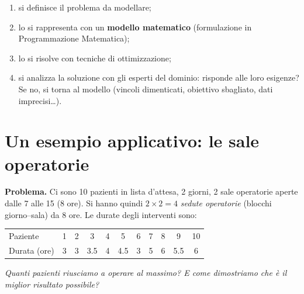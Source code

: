 \begin{center}
\end{center}
\begin{enumerate}[nosep]
  \item si definisce il problema da modellare;
  \item lo si rappresenta con un \textbf{modello matematico} (formulazione in Programmazione Matematica);
  \item lo si risolve con tecniche di ottimizzazione;
  \item si analizza la soluzione con gli esperti del dominio: risponde alle loro esigenze? Se no, si torna al modello (vincoli dimenticati, obiettivo sbagliato, dati imprecisi\ldots).
\end{enumerate}

\section{Un esempio applicativo: le sale operatorie}\label{sec:sale}

\textbf{Problema.} Ci sono 10 pazienti in lista d'attesa, 2 giorni, 2 sale operatorie aperte dalle 7 alle 15 (8 ore). Si hanno quindi $2\times 2 = 4$ \emph{sedute operatorie} (blocchi giorno--sala) da 8 ore. Le durate degli interventi sono:

\begin{center}
\begin{tabular}{@{}l*{10}{c}@{}}
\toprule
Paziente & 1 & 2 & 3 & 4 & 5 & 6 & 7 & 8 & 9 & 10\\
Durata (ore) & 3 & 3 & 3.5 & 4 & 4.5 & 3 & 5 & 6 & 5.5 & 6\\
\bottomrule
\end{tabular}
\end{center}
\emph{Quanti pazienti riusciamo a operare al massimo? E come dimostriamo che è il miglior risultato possibile?}

